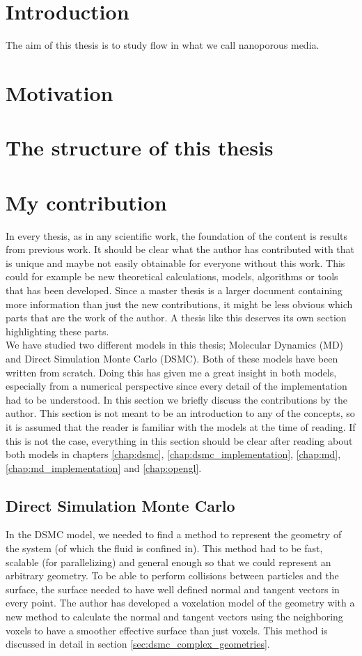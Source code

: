 \section{Introduction}
The aim of this thesis is to study flow in what we call nanoporous media. 

\section{Motivation}


\section{The structure of this thesis}

\section{My contribution}
In every thesis, as in any scientific work, the foundation of the content is results from previous work. It should be clear what the author has contributed with that is unique and maybe not easily obtainable for everyone without this work. This could for example be new theoretical calculations, models, algorithms or tools that has been developed. Since a master thesis is a larger document containing more information than just the new contributions, it might be less obvious which parts that are the work of the author. A thesis like this deserves its own section highlighting these parts.\\
We have studied two different models in this thesis; Molecular Dynamics (MD) and Direct Simulation Monte Carlo (DSMC). Both of these models have been written from scratch. Doing this has given me a great insight in both models, especially from a numerical perspective since every detail of the implementation had to be understood. In this section we briefly discuss the contributions by  the author. This section is not meant to be an introduction to any of the concepts, so it is assumed that the reader is familiar with the models at the time of reading. If this is not the case, everything in this section should be clear after reading about both models in chapters \ref{chap:dsmc}, \ref{chap:dsmc_implementation}, \ref{chap:md}, \ref{chap:md_implementation} and \ref{chap:opengl}.
\subsection{Direct Simulation Monte Carlo}
In the DSMC model, we needed to find a method to represent the geometry of the system (of which the fluid is confined in). This method had to be fast, scalable (for parallelizing) and general enough so that we could represent an arbitrary geometry. To be able to perform collisions between particles and the surface, the surface needed to have well defined normal and tangent vectors in every point. The author has developed a voxelation model of the geometry with a new method to calculate the normal and tangent vectors using the neighboring voxels to have a smoother effective surface than just voxels. This method is discussed in detail in section \ref{sec:dsmc_complex_geometries}.
